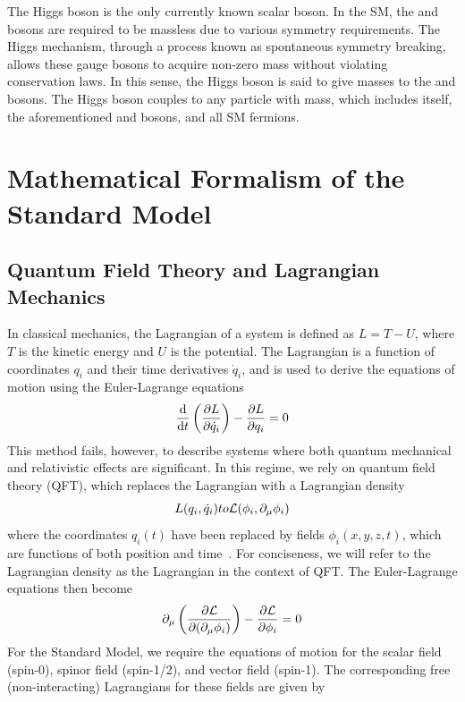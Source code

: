 The Higgs boson is the only currently known scalar boson. In the SM, the \PZ and \PWpm bosons are required to be massless due to various symmetry requirements. The Higgs mechanism, through a process known as spontaneous symmetry breaking, allows these gauge bosons to acquire non-zero mass without violating conservation laws. In this sense, the Higgs boson is said to give masses to the \PZ and \PWpm bosons. The Higgs boson couples to any particle with mass, which includes itself, the aforementioned \PZ and \PWpm bosons, and all SM fermions.

\section{Mathematical Formalism of the Standard Model} \label{sec:sm_theory}

\subsection{Quantum Field Theory and Lagrangian Mechanics} \label{sec:sm_theory_qft}
In classical mechanics, the Lagrangian of a system is defined as $L=T-U$, where $T$ is the kinetic energy and $U$ is the potential. The Lagrangian is a function of coordinates $q_i$ and their time derivatives $\dot{q}_i$, and is used to derive the equations of motion using the Euler-Lagrange equations
\begin{equation}
	\label{eq:eulerlagrange_cm}
	\dv{}{t}\left(\pdv{L}{\dot{q}_i}\right)-\pdv{L}{q_i}=0
\end{equation}
This method fails, however, to describe systems where both quantum mechanical and relativistic effects are significant. In this regime, we rely on quantum field theory (QFT), which replaces the Lagrangian with a Lagrangian density
\begin{equation}
		L(q_i,\dot{q}_i)\to\mathcal{L}(\phi_i,\partial_\mu\phi_i)\\
\end{equation}
where the coordinates $q_i(t)$ have been replaced by fields $\phi_i(x,y,z,t)$, which are functions of both position and time~\cite{Thomson_2013}. For conciseness, we will refer to the Lagrangian density as the Lagrangian in the context of QFT. The Euler-Lagrange equations then become
\begin{equation}
	\label{eq:eulerlagrange_qft}
	\partial_\mu\left(\pdv{\mathcal{L}}{(\partial_\mu\phi_i)}\right)-\pdv{\mathcal{L}}{\phi_i}=0
\end{equation}
For the Standard Model, we require the equations of motion for the scalar field (spin-0), spinor field (spin-1/2), and vector field (spin-1). The corresponding free (non-interacting) Lagrangians for these fields are given by
